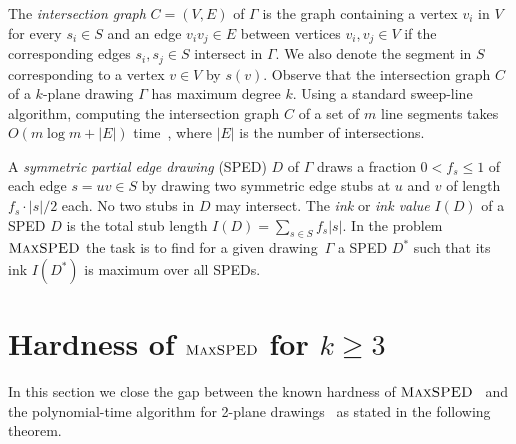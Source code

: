 \documentclass[a4paper,english,numberwithinsect]{eurocg18}
\newcommand{\martin}[1]{\todo[inline,color=blue!40]{MN: #1}}
\newcommand{\fabian}[1]{\todo[inline,color=pink!40]{FK: #1}}
\newcommand{\ped}{\ensuremath{\textsc{PED}}\xspace}
\newcommand{\maxsped}{\ensuremath{\textsc{MaxSPED}}\xspace}
\begin{document}
The \emph{intersection graph} $ C = (V,E) $ of $ \Gamma $ is the graph containing a vertex $v_i$ in $ V $ for every $ s_i \in S $ and an edge $ v_i v_j \in E $ between vertices $ v_i, v_j \in V $ if the corresponding edges $ s_i, s_j \in S $ intersect in $ \Gamma $. 
We also denote the segment in $S$ corresponding to a vertex $v \in V$ by $s(v)$.
Observe that the intersection graph $ C $ of a $ k $-plane drawing $ \Gamma $ has maximum degree $ k $.  
%
Using a standard sweep-line algorithm, computing the intersection graph $C$ of a set of $m$ line segments takes $O(m \log m + |E|)$ time~\cite{bcko-cgaa-08}, where $|E|$ is  the number of intersections.

A \emph{symmetric partial edge drawing} (SPED) $D$ of $\Gamma$ draws a fraction $0 < f_s \le 1$ of each edge $s = uv \in S$ by drawing two symmetric edge stubs at $u$ and $v$ of length $f_s \cdot |s|/2$ each. 
No two stubs in $D$ may intersect.
The \emph{ink} or \emph{ink value}  $I(D)$ of a SPED $D$ is the total stub length $I(D) = \sum_{s \in S} f_s |s|$.
In the problem \maxsped the task is to find for a given drawing~$\Gamma$ a SPED $D^*$ such that its ink $I(D^*)$ is maximum over all SPEDs.

 

%
%

\section{Hardness of \maxsped for $k\ge3$}\label{sec:hardness}

In this section we close the gap between the known hardness of \maxsped~\cite{b-sgh-15} and the polynomial-time algorithm for 2-plane drawings~\cite{bcgkmn-pped-17} as stated in the following theorem.
\end{document}
